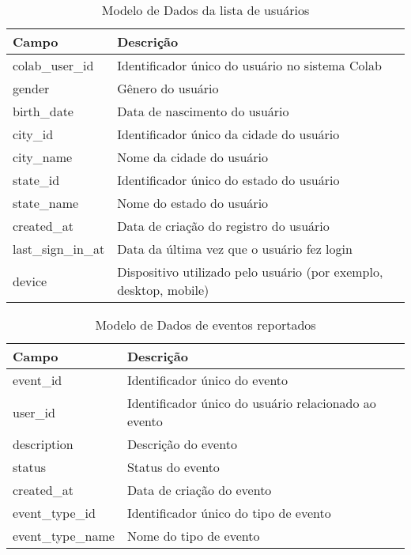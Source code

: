 \begin{table}[ht]
    \centering
    \caption{Modelo de Dados da lista de usuários}
    \label{tab:modelo-dados}
    \begin{tabular}{|l|p{6cm}|}
    \hline
    \textbf{Campo} & \textbf{Descrição} \\
    \hline
    colab\_user\_id & Identificador único do usuário no sistema Colab \\
    gender & Gênero do usuário \\
    birth\_date & Data de nascimento do usuário \\
    city\_id & Identificador único da cidade do usuário \\
    city\_name & Nome da cidade do usuário \\
    state\_id & Identificador único do estado do usuário \\
    state\_name & Nome do estado do usuário \\
    created\_at & Data de criação do registro do usuário \\
    last\_sign\_in\_at & Data da última vez que o usuário fez login \\
    device & Dispositivo utilizado pelo usuário (por exemplo, desktop, mobile) \\
    \hline
    \end{tabular}
\end{table}

\begin{table}[ht]
    \centering
    \caption{Modelo de Dados de eventos reportados}
    \label{tab:modelo-dados-eventos}
    \begin{tabular}{|l|p{6cm}|}
    \hline
    \textbf{Campo} & \textbf{Descrição} \\
    \hline
    event\_id & Identificador único do evento \\
    user\_id & Identificador único do usuário relacionado ao evento \\
    description & Descrição do evento \\
    status & Status do evento \\
    created\_at & Data de criação do evento \\
    event\_type\_id & Identificador único do tipo de evento \\
    event\_type\_name & Nome do tipo de evento \\
    \hline
    \end{tabular}
\end{table}

